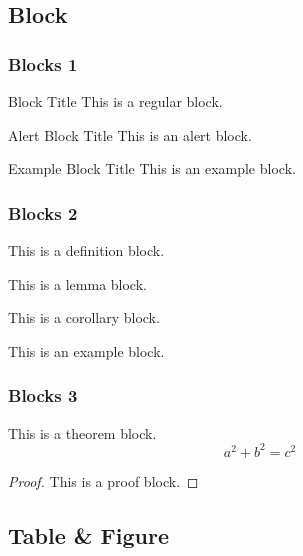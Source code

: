 \documentclass[compress,aspectratio=169]{beamer}
\begin{document}
\subsection{Block}

\begin{frame}
    \frametitle{Blocks 1}
    \begin{block}{Block Title}
        This is a regular block.
    \end{block}

    \begin{alertblock}{Alert Block Title}
        This is an alert block.
    \end{alertblock}

    \begin{exampleblock}{Example Block Title}
        This is an example block.
    \end{exampleblock}
\end{frame}

\begin{frame}
    \frametitle{Blocks 2}
    \begin{definition}[XXX]
        This is a definition block.
    \end{definition}

    \begin{lemma}[XXX]
        This is a lemma block.
    \end{lemma}

    \begin{corollary}[XXX]
        This is a corollary block.
    \end{corollary}

    \begin{example}[XXX]
        This is an example block.
    \end{example}

\end{frame}

\begin{frame}
    \frametitle{Blocks 3}
    \begin{theorem}[XXX]
        This is a theorem block.
        \[
            a^2 + b^2 = c^2
        \]
    \end{theorem}

    \begin{proof}
        This is a proof block.
    \end{proof}

\end{frame}

\subsection{Table \& Figure}
\end{document}
